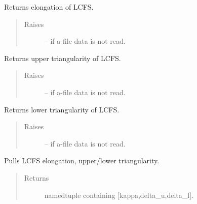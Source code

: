 \documentclass[letterpaper,10pt,english]{sphinxmanual}
\begin{document}
\begin{fulllineitems}
\begin{fulllineitems}
\label{eqtools:eqtools.eqdskreader.EqdskReader.getElongation}
Returns elongation of LCFS.
\begin{quote}\begin{description}
\item[{Raises}] \leavevmode
{} -- if a-file data is not read.

\end{description}\end{quote}

\end{fulllineitems}


\begin{fulllineitems}
\label{eqtools:eqtools.eqdskreader.EqdskReader.getUpperTriangularity}
Returns upper triangularity of LCFS.
\begin{quote}\begin{description}
\item[{Raises}] \leavevmode
{} -- if a-file data is not read.

\end{description}\end{quote}

\end{fulllineitems}


\begin{fulllineitems}
\label{eqtools:eqtools.eqdskreader.EqdskReader.getLowerTriangularity}
Returns lower triangularity of LCFS.
\begin{quote}\begin{description}
\item[{Raises}] \leavevmode
{} -- if a-file data is not read.

\end{description}\end{quote}

\end{fulllineitems}


\begin{fulllineitems}
\label{eqtools:eqtools.eqdskreader.EqdskReader.getShaping}
Pulls LCFS elongation, upper/lower triangularity.
\begin{quote}\begin{description}
\item[{Returns}] \leavevmode
namedtuple containing {[}kappa,delta\_u,delta\_l{]}.


\end{description}
\end{quote}
\end{fulllineitems}
\end{fulllineitems}
\end{document}
